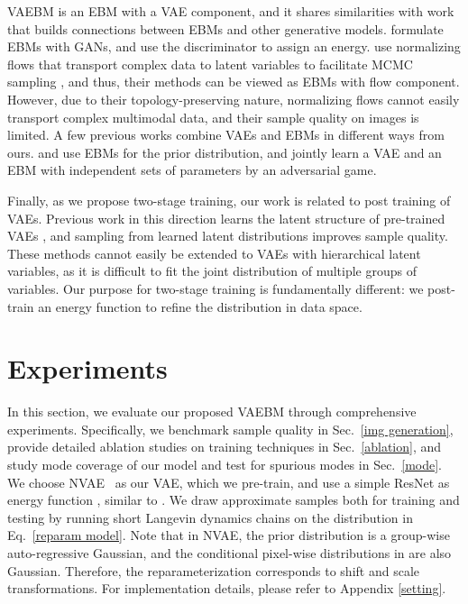 \documentclass{article} \usepackage{iclr2021_conference,times}
\begin{document}
VAEBM is an EBM with a VAE component, and it shares similarities with work that builds connections between EBMs and other generative models.  \citet{zhao2016energy,che2020your,song2020discriminator,Arbel2020GeneralizedEB} formulate EBMs with GANs, and use the discriminator to assign an energy.
\citet{xiao2020exponential,nijkamp2020learning} use normalizing flows that transport complex data to latent variables to facilitate MCMC sampling \citep{hoffman2019neutra}, and thus, their methods can be viewed as EBMs with flow component. However, due to their topology-preserving nature, normalizing flows cannot easily transport complex multimodal data, and their sample quality on images is limited. A few previous works combine VAEs and EBMs in different ways from ours. \citet{pang2020learning} and \citet{Vahdat2018DVAE++,vahdat2018dvaes, vahdat2019UndirectedPost} use EBMs for the prior distribution, and \citep{han2020joint, han2019divergence} jointly learn a VAE and an EBM with independent sets of parameters by an adversarial game. 



Finally, as we propose two-stage training, our work is related to post training of VAEs. Previous work in this direction learns the latent structure of pre-trained VAEs \citep{dai2019diagnosing,xiao2019generative,ghosh2019variational}, and sampling from learned latent distributions improves sample quality. These methods cannot easily be extended to VAEs with hierarchical latent variables, as it is difficult to fit the joint distribution of multiple groups of variables. Our purpose for two-stage training is fundamentally different: we post-train an energy function to refine the distribution in data space. 



%
 \section{Experiments}
In this section, we evaluate our proposed VAEBM through comprehensive experiments. Specifically, we benchmark sample quality in Sec.~\ref{img generation}, provide detailed ablation studies on training techniques in Sec.~\ref{ablation}, and study mode coverage of our model and test for spurious modes in Sec.~\ref{mode}. We choose NVAE~\citep{vahdat2020nvae} as our VAE, which we pre-train, and use a simple ResNet as energy function , similar to \citet{du2019implicit}. We draw approximate samples both for training and testing by running short Langevin dynamics chains on the distribution in Eq.~\ref{reparam model}. Note that in NVAE, the prior distribution is a group-wise auto-regressive Gaussian, and the conditional pixel-wise distributions in  are also Gaussian. Therefore, the reparameterization corresponds to shift and scale transformations.
For implementation details, please refer to Appendix \ref{setting}. 
\end{document}
